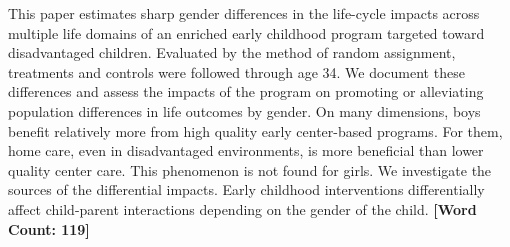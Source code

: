 \noindent This paper estimates sharp gender differences in the life-cycle impacts across multiple life domains of an enriched early childhood program targeted toward disadvantaged children. Evaluated by the method of random assignment, treatments and controls were followed through age 34. We document these differences and assess the impacts of the program on promoting or alleviating population differences in life outcomes by gender. On many dimensions, boys benefit relatively more from high quality early center-based programs. For them, home care, even in disadvantaged environments, is more beneficial than lower quality center care. This phenomenon is not found for girls. We investigate the sources of the differential impacts. Early childhood interventions differentially affect child-parent interactions depending on the gender of the child. \textbf{[Word Count: 119]}